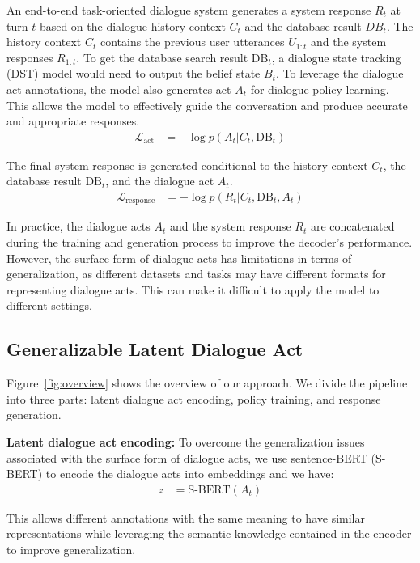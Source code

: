 An end-to-end task-oriented dialogue system generates a system response $R_t$ at turn $t$ based on the dialogue history context $C_t$ and the database result $DB_t$.
The history context $C_t$ contains the previous user utterances $U_{1:t}$ and the system responses $R_{1:t}$. 
To get the database search result $\text{DB}_t$, a dialogue state tracking (DST) model would need to output the belief state $B_t$.
To leverage the dialogue act annotations, the model also generates act $A_t$ for dialogue policy learning.
This allows the model to effectively guide the conversation and produce accurate and appropriate responses.
\begin{align}
    \mathcal{L}_{\text{act}} &= - \log p(A_t | C_t, \text{DB}_t)
\end{align}

The final system response is generated conditional to the history context $C_t$, the database result $\text{DB}_t$, and the dialogue act $A_t$.
\begin{align}
    \mathcal{L}_{\text{response}} &= - \log p(R_t | C_t, \text{DB}_t, A_t)
\end{align}

In practice, the dialogue acts $A_t$ and the system response $R_t$ are concatenated during the training and generation process to improve the decoder's performance. 
However, the surface form of dialogue acts has limitations in terms of generalization, as different datasets and tasks may have different formats for representing dialogue acts. This can make it difficult to apply the model to different settings.

\subsection{Generalizable Latent Dialogue Act}

Figure~\ref{fig:overview} shows the overview of our approach. 
We divide the pipeline into three parts: latent dialogue act encoding, policy training, and response generation.

\textbf{Latent dialogue act encoding:} To overcome the generalization issues associated with the surface form of dialogue acts, we use sentence-BERT (S-BERT) to encode the dialogue acts into embeddings and we have:
\begin{align}
     z &= \text{S-BERT} (A_t)
\end{align}

This allows different annotations with the same meaning to have similar representations while leveraging the semantic knowledge contained in the encoder to improve generalization.

